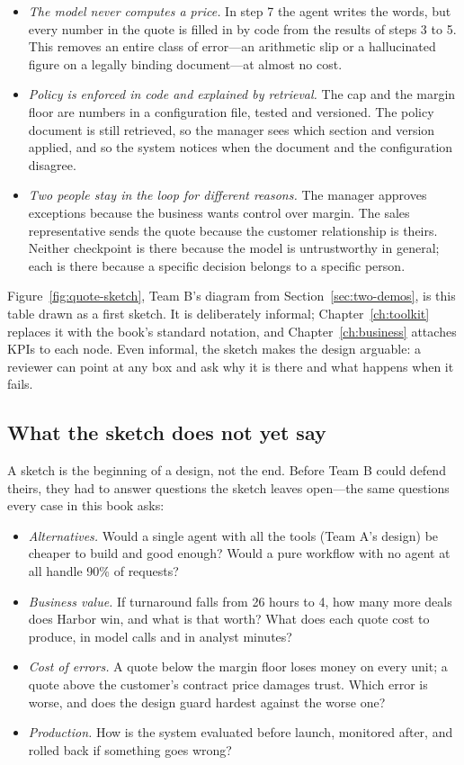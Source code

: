 \begin{itemize}[itemsep=2pt]
  \item \emph{The model never computes a price.} In step 7 the agent writes the words, but every number in the quote is filled in by code from the results of steps 3 to 5. This removes an entire class of error---an arithmetic slip or a hallucinated figure on a legally binding document---at almost no cost.
  \item \emph{Policy is enforced in code and explained by retrieval.} The cap and the margin floor are numbers in a configuration file, tested and versioned. The policy document is still retrieved, so the manager sees which section and version applied, and so the system notices when the document and the configuration disagree.
  \item \emph{Two people stay in the loop for different reasons.} The manager approves exceptions because the business wants control over margin. The sales representative sends the quote because the customer relationship is theirs. Neither checkpoint is there because the model is untrustworthy in general; each is there because a specific decision belongs to a specific person.
\end{itemize}

Figure~\ref{fig:quote-sketch}, Team B's diagram from Section~\ref{sec:two-demos}, is this table drawn as a first sketch. It is deliberately informal; Chapter~\ref{ch:toolkit} replaces it with the book's standard notation, and Chapter~\ref{ch:business} attaches KPIs to each node. Even informal, the sketch makes the design arguable: a reviewer can point at any box and ask why it is there and what happens when it fails.

\subsection{What the sketch does not yet say}

A sketch is the beginning of a design, not the end. Before Team B could defend theirs, they had to answer questions the sketch leaves open---the same questions every case in this book asks:
\begin{itemize}[itemsep=1pt]
  \item \emph{Alternatives.} Would a single agent with all the tools (Team A's design) be cheaper to build and good enough? Would a pure workflow with no agent at all handle 90\% of requests?
  \item \emph{Business value.} If turnaround falls from 26 hours to 4, how many more deals does Harbor win, and what is that worth? What does each quote cost to produce, in model calls and in analyst minutes?
  \item \emph{Cost of errors.} A quote below the margin floor loses money on every unit; a quote above the customer's contract price damages trust. Which error is worse, and does the design guard hardest against the worse one?
  \item \emph{Production.} How is the system evaluated before launch, monitored after, and rolled back if something goes wrong?
\end{itemize}

